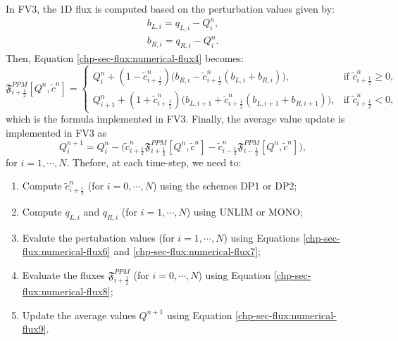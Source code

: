 In FV3, the 1D flux is computed based on the perturbation values \citep{harris:2021} given by:
\begin{align}
\label{chp-sec-flux:numerical-flux6}
b_{L,i} = q_{L,i} - Q_i^n, \\
\label{chp-sec-flux:numerical-flux7}
b_{R,i} = q_{R,i} - Q_i^n.
\end{align}
Then, Equation \eqref{chp-sec-flux:numerical-flux4} becomes:
\begin{equation}
	\label{chp-sec-flux:numerical-flux8}
        \mathfrak{F}_{i+\frac{1}{2}}^{PPM}[Q^n,\tilde{c}^n]  =  
    	\begin{cases}
        Q_{i}^n +
        (1-\tilde{c}_{{i+\frac{1}{2}}}^n)
        \big(b_{R,i}-\tilde{c}_{{i+\frac{1}{2}}}^n
        (b_{L,i}+b_{R,i})\big),
	& \text{if } \tilde{c}_{i+\frac{1}{2}}^n \geq 0,\\
	Q_{i+1}^n +
        (1+\tilde{c}_{{i+\frac{1}{2}}}^n)
        \big(b_{L,i+1}+\tilde{c}_{{i+\frac{1}{2}}}^n
        (b_{L,i+1}+b_{R,i+1})\big),
	& \text{if } \tilde{c}_{i+\frac{1}{2}}^n<0,
    	\end{cases}
\end{equation}
which is the formula implemented in FV3.
Finally, the average value update is implemented in FV3 as
\begin{equation}
	\label{chp-sec-flux:numerical-flux9}
	Q_i^{n+1} = Q_i^{n} - 
        \big(\tilde{c}_{i+\frac{1}{2}}^n\mathfrak{F}_{i+\frac{1}{2}}^{PPM}[Q^n,\tilde{c}^n] -
        \tilde{c}_{i-\frac{1}{2}}^n\mathfrak{F}_{i-\frac{1}{2}}^{PPM}[Q^n,\tilde{c}^n]  \big),
\end{equation}
for $i=1, \cdots, N$.
Thefore, at each time-step, we need to:
\begin{enumerate}
\item Compute $\tilde{c}_{i+\frac{1}{2}}^n$ (for $i = 0, \cdots, N$) using the schemes DP1 or DP2;
\item Compute $q_{L,i}$ and  $q_{R,i}$ (for $i = 1, \cdots, N$) using UNLIM or MONO;
\item Evalute the pertubation values (for $i = 1, \cdots, N$) using Equations
\eqref{chp-sec-flux:numerical-flux6} and \eqref{chp-sec-flux:numerical-flux7};
\item Evaluate the fluxes  $\mathfrak{F}_{i+\frac{1}{2}}^{PPM}$ (for $i = 0, \cdots, N$) using Equation \eqref{chp-sec-flux:numerical-flux8};
\item Update the average values $Q^{n+1}$ using Equation \eqref{chp-sec-flux:numerical-flux9}.
\end{enumerate}
